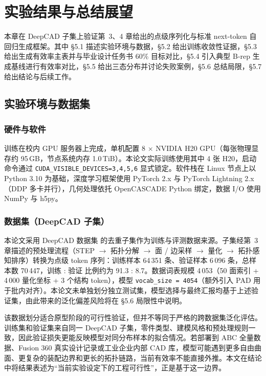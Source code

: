 
\chapter{实验结果与总结展望}

本章在 DeepCAD 子集上验证第~3、4 章给出的点级序列化与标准 next-token 自回归生成框架。其中 §5.1 描述实验环境与数据，§5.2 给出训练收敛性证据，§5.3 给出生成有效率主表并与毕业设计任务书 60\% 目标对比，§5.4 引入典型 B-rep 生成基线进行有效率对比，§5.5 给出三态分布并讨论失败案例，§5.6 总结局限，§5.7 给出结论与后续工作。

\section{实验环境与数据集}

\subsection{硬件与软件}

训练在校内 GPU 服务器上完成，单机配置 8 $\times$ NVIDIA H20 GPU（每张物理显存约 95\,GB，节点系统内存 1.0\,TiB）。本论文实际训练使用其中 4 张 H20，启动命令通过 \texttt{CUDA\_VISIBLE\_DEVICES=3,4,5,6} 显式锁定。软件栈在 Linux 节点上以 Python 3.10 为基础，深度学习框架使用 PyTorch 2.x\cite{paszke_2019_pytorch} 与 PyTorch Lightning 2.x（DDP 多卡并行），几何处理依托 OpenCASCADE Python 绑定，数据 I/O 使用 NumPy 与 h5py。

\subsection{数据集（DeepCAD 子集）}

本论文采用 DeepCAD 数据集\cite{wu_2021_deepcad} 的去重子集作为训练与评测数据来源。子集经第~3 章描述的预处理流程（STEP $\to$ 拓扑分解 $\to$ 面 / 边采样 $\to$ 量化 $\to$ 拓扑感知排序）转换为点级 token 序列：训练样本 64\,351 条、验证样本 6\,096 条，总样本数 70\,447，训练 : 验证 比例约为 91.3 : 8.7。数据词表规模 4\,053（50 面索引 + 4\,000 量化坐标 + 3 个结构 token），模型 \texttt{vocab\_size = 4054}（额外引入 PAD 用于批内对齐）。本论文未单独划分独立测试集，模型选择与最终汇报均基于上述验证集，由此带来的泛化偏差风险将在 §5.6 局限性中说明。

该数据划分适合原型阶段的可行性验证，但并不等同于严格的跨数据集泛化评估。训练集和验证集来自同一 DeepCAD 子集，零件类型、建模风格和预处理规则一致，因此验证损失更能反映模型对同分布样本的拟合情况。若部署到 ABC 全量数据、Fusion 360 真实设计记录或工业企业内部 CAD 库，模型可能遇到更多自由曲面、更复杂的装配边界和更长的拓扑链路，当前有效率不能直接外推。本文在结论中将结果表述为“当前实验设定下的工程可行性”，正是基于这一边界。

